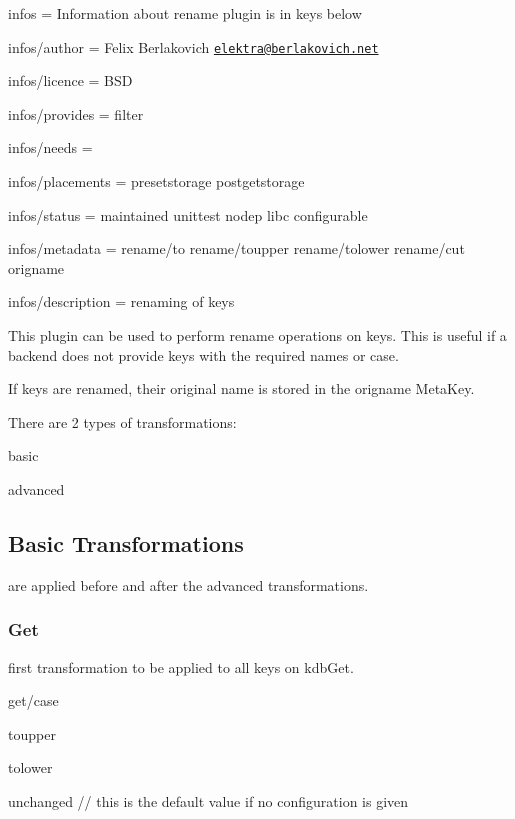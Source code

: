 
\begin{DoxyItemize}
\item infos = Information about rename plugin is in keys below
\item infos/author = Felix Berlakovich \href{mailto:elektra@berlakovich.net}{\tt elektra@berlakovich.\+net}
\item infos/licence = B\+SD
\item infos/provides = filter
\item infos/needs =
\item infos/placements = presetstorage postgetstorage
\item infos/status = maintained unittest nodep libc configurable
\item infos/metadata = rename/to rename/toupper rename/tolower rename/cut origname
\item infos/description = renaming of keys
\end{DoxyItemize}

This plugin can be used to perform rename operations on keys. This is useful if a backend does not provide keys with the required names or case.

If keys are renamed, their original name is stored in the {\ttfamily origname} Meta\+Key.

There are 2 types of transformations\+:


\begin{DoxyItemize}
\item basic
\item advanced
\end{DoxyItemize}

\subsection*{Basic Transformations}

are applied before and after the advanced transformations.

\subsubsection*{Get}

first transformation to be applied to all keys on kdb\+Get.

{\ttfamily get/case}


\begin{DoxyItemize}
\item toupper
\item tolower
\item unchanged // this is the default value if no configuration is given
\end{DoxyItemize}

